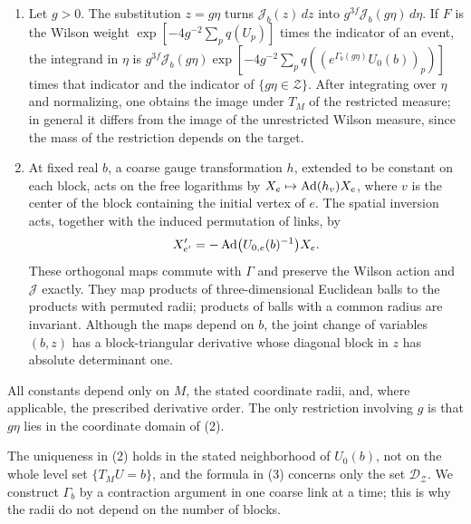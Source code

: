 \begin{lemma}
\begin{enumerate}
\[
 \int_{\mathcal D_{\mathcal Z}}F(U)\,dH_{Mm}(U)
 =\int dH_m(b)\int_{\mathcal Z}\mathscr J_b(z)\,dz\int F\bigl((e^{\Gamma_b(z)}U_0(b))^k\bigr)\,dH_{\mathrm{for}}(k),
\]
where $dz$ is Lebesgue measure on $\R^{3f}$ and $H_{\mathrm{for}}$ is the product Haar probability measure on the values of $k$ at the vertices other than block centers. For gauge-invariant $F$ the inner integral equals $F(e^{\Gamma_b(z)}U_0(b))$. The numerator of $\mathscr J_b$ contains the Haar density of every eliminated edge, and no further factor (no density in a coarse logarithm, no Gram determinant, and no volume of a gauge orbit) occurs.
\item Let $g>0$. The substitution $z=g\eta$ turns $\mathscr J_b(z)\,dz$ into $g^{3f}\mathscr J_b(g\eta)\,d\eta$. If $F$ is the Wilson weight $\exp[-4g^{-2}\sum_pq(U_p)]$ times the indicator of an event, the integrand in $\eta$ is $g^{3f}\mathscr J_b(g\eta)\exp[-4g^{-2}\sum_pq((e^{\Gamma_b(g\eta)}U_0(b))_p)]$ times that indicator and the indicator of $\{g\eta\in\mathcal Z\}$. After integrating over $\eta$ and normalizing, one obtains the image under $T_M$ of the restricted measure; in general it differs from the image of the unrestricted Wilson measure, since the mass of the restriction depends on the target.
\item At fixed real $b$, a coarse gauge transformation $h$, extended to be constant on each block, acts on the free logarithms by $X_e\mapsto\operatorname{Ad}(h_v)X_e$, where $v$ is the center of the block containing the initial vertex of $e$. The spatial inversion acts, together with the induced permutation of links, by
\[
 X'_{e'}=-\operatorname{Ad}\bigl(U_{0,e}(b)^{-1}\bigr)X_e.
\]
These orthogonal maps commute with $\Gamma$ and preserve the Wilson action and $\mathscr J$ exactly. They map products of three-dimensional Euclidean balls to the products with permuted radii; products of balls with a common radius are invariant. Although the maps depend on $b$, the joint change of variables $(b,z)$ has a block-triangular derivative whose diagonal block in $z$ has absolute determinant one.
\end{enumerate}
All constants depend only on $M$, the stated coordinate radii, and, where applicable, the prescribed derivative order. The only restriction involving $g$ is that $g\eta$ lies in the coordinate domain of (2).
\end{lemma}

The uniqueness in (2) holds in the stated neighborhood of $U_0(b)$, not on the whole level set $\{T_MU=b\}$, and the formula in (3) concerns only the set $\mathcal D_{\mathcal Z}$. We construct $\Gamma_b$ by a contraction argument in one coarse link at a time; this is why the radii do not depend on the number of blocks.

